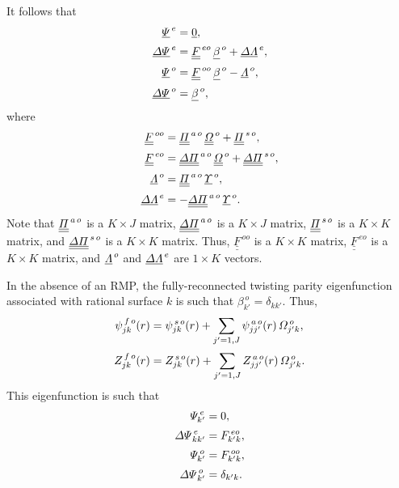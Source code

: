 \documentclass[12pt,prb,aps,notitlepage]{revtex4-1}
\begin{document}
It follows that
\begin{align}\label{e49}
\underline{\mit\Psi}^{\,e} &= \underline{0},\\[0.5ex]
\underline{\mit\Delta\Psi}^{\,e} &= \underline{\underline{F}}^{\,eo}\,\underline{\beta}^{\,o} + \underline{\mit\Delta\Lambda}^{\,e},\\[0.5ex]
\underline{\mit\Psi}^{\,o} &= \underline{\underline{F}}^{\,oo}\,\underline{\beta}^{\,o} - \underline{\mit\Lambda}^{\,o},\\[0.5ex]
\underline{\mit\Delta\Psi}^{\,o} &= \underline{\beta}^{\,o},\label{e52}
\end{align}
where
\begin{align}
\underline{\underline{F}}^{\,oo} &= \underline{\underline{\mit\Pi}}^{\,a\,o}\,\underline{\underline{\mit\Omega}}^{\,o} + \underline{\underline{\mit\Pi}}^{\,s\,o},\\[0.5ex]
\underline{\underline{F}}^{\,eo} &= \underline{\underline{\mit\Delta\Pi}}^{\,a\,o}\,\underline{\underline{\mit\Omega}}^{\,o} + \underline{\underline{\mit\Delta\Pi}}^{\,s\,o},\\[0.5ex]
\underline{\mit\Lambda}^{\,o}&= \underline{\underline{\mit\Pi}}^{\,a\,o}\,\underline{\mit\Upsilon}^{\,o},\\[0.5ex]
\underline{\mit\Delta\Lambda}^{\,e}&= -\underline{\underline{\mit\Delta\Pi}}^{\,a\,o}\,\underline{\mit\Upsilon}^{\,o}.
\end{align}
Note that  $\underline{\underline{\mit\Pi}}^{\,a\,o}$ is a $K\times J$ matrix, $\underline{\underline{\mit\Delta\Pi}}^{\,a\,o}$ is a $K\times J$ matrix, 
$\underline{\underline{\mit\Pi}}^{\,s\,o}$ is a $K\times K$ matrix, and $\underline{\underline{\mit\Delta\Pi}}^{\,s\,o}$ is a $K\times K$ matrix. 
Thus, $\underline{\underline{F}}^{\,oo}$ is a $K\times K$ matrix,  $\underline{\underline{F}}^{\,eo}$ is a $K\times K$ matrix, and $\underline{\mit\Lambda}^{\,o}$ and 
$\underline{\mit\Delta\Lambda}^{\,e}$ are $1\times K$ vectors. 

In the absence of an RMP, the fully-reconnected twisting parity eigenfunction associated with rational surface $k$ is such that $\beta^{\,o}_{k'} = \delta_{kk'}$. 
Thus,
\begin{align}
\psi^{\,f\,o}_{jk}(r) &= \psi^{\,s\,o}_{jk}(r) + \sum_{j'=1,J} \psi_{jj'}^{\,a\,o}(r)\,{\mit\Omega}^{\,o}_{j'k},\\[0.5ex]
Z^{\,f\,o}_{jk}(r) &= Z^{\,s\,o}_{jk}(r) + \sum_{j'=1,J} Z_{jj'}^{\,a\,o}(r)\,{\mit\Omega}^{\,o}_{j'k}.
\end{align}
This eigenfunction is such that
\begin{align}
{\mit\Psi}^{\,e}_{k'} &=0 ,\\[0.5ex]
{\mit\Delta\Psi}^{\,e}_{kk'} &= F^{\,eo}_{k'k},\\[0.5ex]
{\mit\Psi}^{\,o}_{k'} &= F^{\,oo}_{k'k},\\[0.5ex]
{\mit\Delta\Psi}^{\,o}_{k'} &=\delta_{k'k}.
\end{align}
\end{document}
